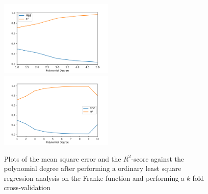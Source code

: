 \documentclass[a4paper,10pt,english]{article}
\begin{document}
\begin{figure}[H]
	\centering 
	\includegraphics[width = 0.5\textwidth, center]{../franke_output/part_B.png}
	\includegraphics[width = 0.5\textwidth, center]{../franke_output/part_B_highdeg.png}
	\caption{
		Plots of the mean square error and the $R^2$-score against the polynomial degree after performing a ordinary least square regression analysis on the Franke-function and performing a $k$-fold cross-validation
	}
	\label{part_b}
\end{figure}
\end{document}
